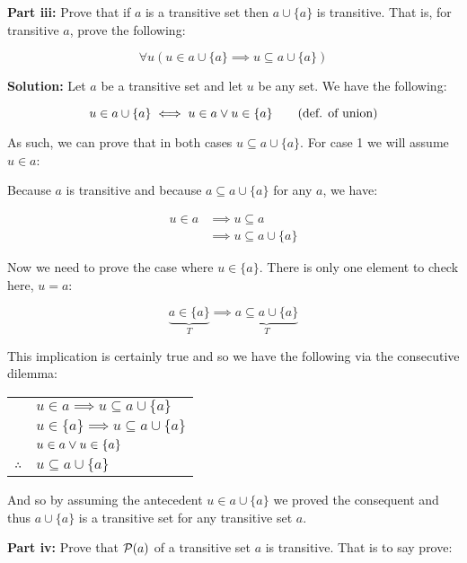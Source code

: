 \documentclass{article}
\begin{document}
\noindent\textbf{Part iii:} Prove that if $a$ is a transitive set then $a\cup\{a\}$ is transitive. That is, for transitive $a$, prove the following:

$$\forall u(u\in a\cup\{a\}\implies u\subseteq a\cup\{a\})$$
\bigskip

\noindent\textbf{Solution:} Let $a$ be a transitive set and let $u$ be any set. We have the following:

\begin{equation}
    u\in a \cup\{a\}\iff u\in a\vee u\in\{a\}\tag{def. of union}
\end{equation}

As such, we can prove that in both cases $u\subseteq a\cup \{a\}$. For case 1 we will assume $u\in a$:

Because $a$ is transitive and because $a\subseteq a\cup\{a\}$ for any $a$, we have:

\begin{align*}
    u\in a&\implies u\subseteq a\tag{$a$ is transitive}\\
    &\implies u\subseteq a\cup\{a\}\tag{transitivity of subset}
\end{align*}

Now we need to prove the case where $u\in\{a\}$. There is only one element to check here, $u=a$:

$$\underbrace{a\in\{a\}}_{T}\implies\underbrace{a\subseteq a\cup \{a\}}_{T}$$

This implication is certainly true and so we have the following via the consecutive dilemma:

\begin{center}
    \begin{tabular}{c@{\,}l@{}} 
        & $u\in a\implies u\subseteq a\cup \{a\}$ \\
        & $u\in \{a\}\implies u\subseteq a\cup \{a\}$ \\
        & $u\in a\vee u\in \{a\}$ \\
        \cline{2-2}
    $\therefore$         & $u\subseteq a\cup \{a\}$ \\
    \end{tabular}
\end{center}

And so by assuming the antecedent $u\in a\cup\{a\}$ we proved the consequent and thus $a\cup \{a\}$ is a transitive set for any transitive set $a$.
\bigskip

\noindent\textbf{Part iv:} Prove that $\mathcal P(a)$ of a transitive set $a$ is transitive. That is to say prove:
\end{document}
